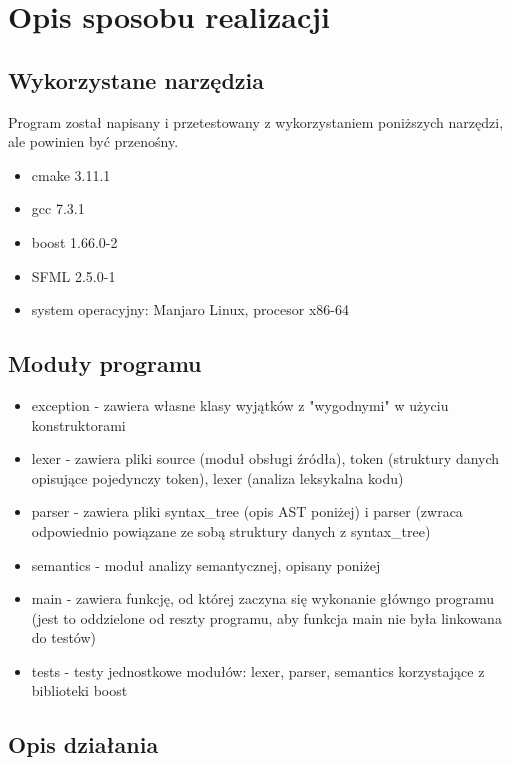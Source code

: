 \documentclass{article}
\begin{document}
\section{Opis sposobu realizacji}

\subsection{Wykorzystane narzędzia}
Program został napisany i przetestowany z wykorzystaniem poniższych narzędzi, ale powinien być przenośny.
\begin{itemize}
    \item{cmake 3.11.1}
    \item{gcc 7.3.1}
    \item{boost 1.66.0-2}
    \item{SFML 2.5.0-1}
    \item{system operacyjny: Manjaro Linux, procesor x86-64}
\end{itemize}

\subsection{Moduły programu}
\begin{itemize}
    \item{exception - zawiera własne klasy wyjątków z "wygodnymi" w użyciu konstruktorami}
    \item{lexer - zawiera pliki source (moduł obsługi źródła), token (struktury danych opisujące pojedynczy token), lexer (analiza leksykalna kodu)}
    \item{parser - zawiera pliki syntax\_tree (opis AST poniżej) i parser (zwraca odpowiednio powiązane ze sobą struktury danych z syntax\_tree)}
    \item{semantics - moduł analizy semantycznej, opisany poniżej}
    \item{main - zawiera funkcję, od której zaczyna się wykonanie główngo programu (jest to oddzielone od reszty programu, aby funkcja main nie była linkowana do testów)}
    \item{tests - testy jednostkowe modułów: lexer, parser, semantics korzystające z biblioteki boost}
\end{itemize}

\subsection{Opis działania}
\end{document}
